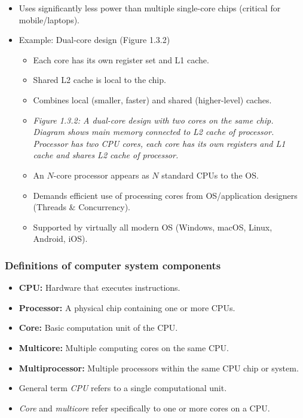 \documentclass{article}
\begin{document}
\begin{itemize}
\begin{itemize}
        \item Uses significantly less power than multiple single-core chips (critical for mobile/laptops).
        \item Example: Dual-core design (Figure 1.3.2)
        \begin{itemize}
            \item Each core has its own register set and L1 cache.
            \item Shared L2 cache is local to the chip.
            \item Combines local (smaller, faster) and shared (higher-level) caches.
        \item \textit{Figure 1.3.2: A dual-core design with two cores on the same chip. Diagram shows main memory connected to L2 cache of processor. Processor has two CPU cores, each core has its own registers and L1 cache and shares L2 cache of processor.}
        \item An $N$-core processor appears as $N$ standard CPUs to the OS.
        \item Demands efficient use of processing cores from OS/application designers (Threads \& Concurrency).
        \item Supported by virtually all modern OS (Windows, macOS, Linux, Android, iOS).
    \end{itemize}
\end{itemize} %
\end{itemize} %

\subsubsection*{Definitions of computer system components}
\begin{itemize}
    \item \textbf{CPU:} Hardware that executes instructions.
    \item \textbf{Processor:} A physical chip containing one or more CPUs.
    \item \textbf{Core:} Basic computation unit of the CPU.
    \item \textbf{Multicore:} Multiple computing cores on the same CPU.
    \item \textbf{Multiprocessor:} Multiple processors within the same CPU chip or system.
\end{itemize}
\begin{itemize}
    \item General term \textit{CPU} refers to a single computational unit.
    \item \textit{Core} and \textit{multicore} refer specifically to one or more cores on a CPU.
\end{itemize}
\end{document}
